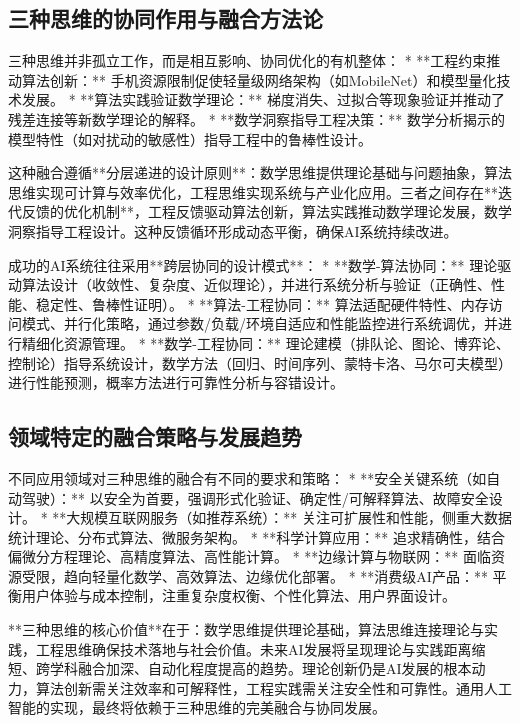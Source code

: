 \subsection*{ 三种思维的协同作用与融合方法论}

三种思维并非孤立工作，而是相互影响、协同优化的有机整体：
*   **工程约束推动算法创新：** 手机资源限制促使轻量级网络架构（如MobileNet）和模型量化技术发展。
*   **算法实践验证数学理论：** 梯度消失、过拟合等现象验证并推动了残差连接等新数学理论的解释。
*   **数学洞察指导工程决策：** 数学分析揭示的模型特性（如对扰动的敏感性）指导工程中的鲁棒性设计。

这种融合遵循**分层递进的设计原则**：数学思维提供理论基础与问题抽象，算法思维实现可计算与效率优化，工程思维实现系统与产业化应用。三者之间存在**迭代反馈的优化机制**，工程反馈驱动算法创新，算法实践推动数学理论发展，数学洞察指导工程设计。这种反馈循环形成动态平衡，确保AI系统持续改进。

成功的AI系统往往采用**跨层协同的设计模式**：
*   **数学-算法协同：** 理论驱动算法设计（收敛性、复杂度、近似理论），并进行系统分析与验证（正确性、性能、稳定性、鲁棒性证明）。
*   **算法-工程协同：** 算法适配硬件特性、内存访问模式、并行化策略，通过参数/负载/环境自适应和性能监控进行系统调优，并进行精细化资源管理。
*   **数学-工程协同：** 理论建模（排队论、图论、博弈论、控制论）指导系统设计，数学方法（回归、时间序列、蒙特卡洛、马尔可夫模型）进行性能预测，概率方法进行可靠性分析与容错设计。

\subsection*{领域特定的融合策略与发展趋势}

不同应用领域对三种思维的融合有不同的要求和策略：
*   **安全关键系统（如自动驾驶）：** 以安全为首要，强调形式化验证、确定性/可解释算法、故障安全设计。
*   **大规模互联网服务（如推荐系统）：** 关注可扩展性和性能，侧重大数据统计理论、分布式算法、微服务架构。
*   **科学计算应用：** 追求精确性，结合偏微分方程理论、高精度算法、高性能计算。
*   **边缘计算与物联网：** 面临资源受限，趋向轻量化数学、高效算法、边缘优化部署。
*   **消费级AI产品：** 平衡用户体验与成本控制，注重复杂度权衡、个性化算法、用户界面设计。

**三种思维的核心价值**在于：数学思维提供理论基础，算法思维连接理论与实践，工程思维确保技术落地与社会价值。未来AI发展将呈现理论与实践距离缩短、跨学科融合加深、自动化程度提高的趋势。理论创新仍是AI发展的根本动力，算法创新需关注效率和可解释性，工程实践需关注安全性和可靠性。通用人工智能的实现，最终将依赖于三种思维的完美融合与协同发展。
